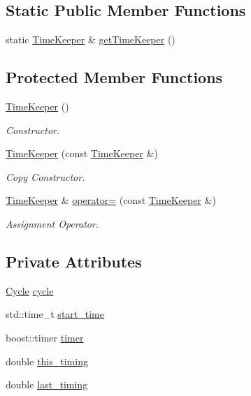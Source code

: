 \subsection*{\-Static \-Public \-Member \-Functions}
\begin{DoxyCompactItemize}
\item 
static \hyperlink{classcryomesh_1_1common_1_1TimeKeeper}{\-Time\-Keeper} \& \hyperlink{classcryomesh_1_1common_1_1TimeKeeper_afe7b229532e11119cb2653192615d679}{get\-Time\-Keeper} ()
\end{DoxyCompactItemize}
\subsection*{\-Protected \-Member \-Functions}
\begin{DoxyCompactItemize}
\item 
\hyperlink{classcryomesh_1_1common_1_1TimeKeeper_a133c730f64b915e6ef25be1442ea688e}{\-Time\-Keeper} ()
\begin{DoxyCompactList}\small\item\em \-Constructor. \end{DoxyCompactList}\item 
\hyperlink{classcryomesh_1_1common_1_1TimeKeeper_a3ea9062a72b2cc0af37b445ed254b64f}{\-Time\-Keeper} (const \hyperlink{classcryomesh_1_1common_1_1TimeKeeper}{\-Time\-Keeper} \&)
\begin{DoxyCompactList}\small\item\em \-Copy \-Constructor. \end{DoxyCompactList}\item 
\hyperlink{classcryomesh_1_1common_1_1TimeKeeper}{\-Time\-Keeper} \& \hyperlink{classcryomesh_1_1common_1_1TimeKeeper_ad22e5329268d4e6f55b4a29045c11035}{operator=} (const \hyperlink{classcryomesh_1_1common_1_1TimeKeeper}{\-Time\-Keeper} \&)
\begin{DoxyCompactList}\small\item\em \-Assignment \-Operator. \end{DoxyCompactList}\end{DoxyCompactItemize}
\subsection*{\-Private \-Attributes}
\begin{DoxyCompactItemize}
\item 
\hyperlink{classcryomesh_1_1common_1_1Cycle}{\-Cycle} \hyperlink{classcryomesh_1_1common_1_1TimeKeeper_af2f511fb5df5b4a1e6d9eb8dffa4f6ef}{cycle}
\item 
std\-::time\-\_\-t \hyperlink{classcryomesh_1_1common_1_1TimeKeeper_ad6e92ec3c962aa3e6db82d69188e9686}{start\-\_\-time}
\item 
boost\-::timer \hyperlink{classcryomesh_1_1common_1_1TimeKeeper_a41690fc156fdee825fb5e7a5e26a2102}{timer}
\item 
double \hyperlink{classcryomesh_1_1common_1_1TimeKeeper_afe9c0b2cd669e9d4d62718734e5b630a}{this\-\_\-timing}
\item 
double \hyperlink{classcryomesh_1_1common_1_1TimeKeeper_acb896ec81cbe9d18f4e618320353dc4f}{last\-\_\-timing}
\end{DoxyCompactItemize}
